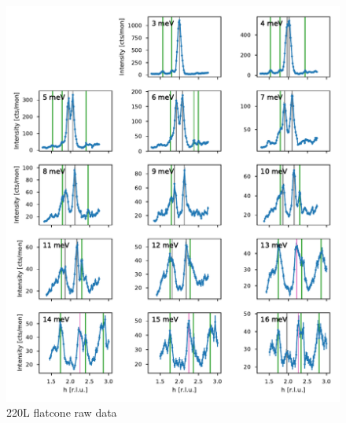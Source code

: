 \begin{figure}
    \centering
    \includegraphics[width=\textwidth]{fig/lowen/fits_220L.pdf}
    \caption[220L flatcone raw data]{220L flatcone raw data}
    \label{fig:flatcone_phonons_220L_raw}    
\end{figure}

